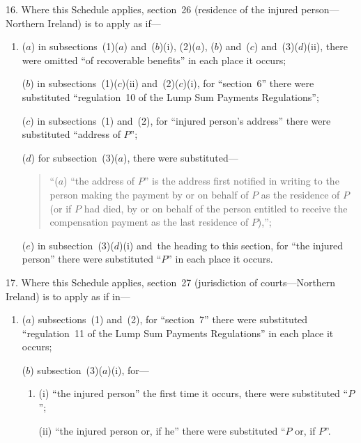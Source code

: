 \documentclass[12pt,a4paper]{article}
\begin{document}
16.  Where this Schedule applies, section~26 (residence of the injured person---Northern Ireland) is to apply as if—
\begin{enumerate}\item[]
($a$) in subsections~(1)($a$)  and~($b$)(i), (2)($a$), ($b$)  and~($c$)  and~(3)($d$)(ii), there were omitted “of recoverable benefits” in each place it occurs;

($b$) in subsections~(1)($c$)(ii)  and~(2)($c$)(i), for “section~6” there were substituted “regulation~10 of the Lump Sum Payments Regulations”;

($c$) in subsections~(1) and~(2), for “injured person’s address” there were substituted “address of $P$”;

($d$) for subsection~(3)($a$), there were substituted—
\begin{quotation}
“($a$) “the address of $P$” is the address first notified in writing to the person making the payment by or on behalf of $P$ as the residence of $P$ (or if $P$ had died, by or on behalf of the person entitled to receive the compensation payment as the last residence of $P$),”;
\end{quotation}

($e$) in subsection~(3)($d$)(i)  and~the heading to this section, for “the injured person” there were substituted “$P$” in each place it occurs.
\end{enumerate}

\medskip

17.  Where this Schedule applies, section~27 (jurisdiction of courts---Northern Ireland) is to apply as if in—
\begin{enumerate}\item[]
($a$) subsections~(1) and~(2), for “section~7” there were substituted “regulation~11 of the Lump Sum Payments Regulations” in each place it occurs;

($b$) subsection~(3)($a$)(i), for—
\begin{enumerate}\item[]
(i) “the injured person” the first time it occurs, there were substituted “$P$”;

(ii) “the injured person or, if he” there were substituted “$P$ or, if $P$”.
\end{enumerate}
\end{enumerate}

\medskip
\end{document}

